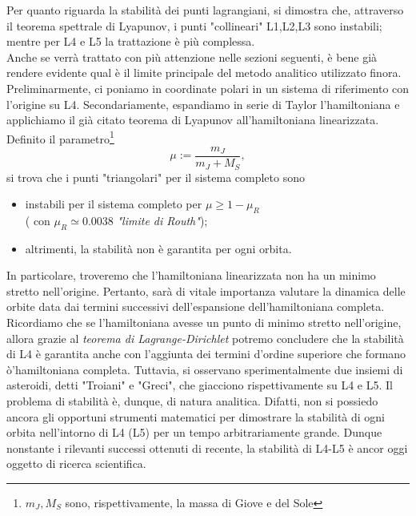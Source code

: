 \documentclass[a4paper,11pt,titlepage]{report}
\theoremstyle{definition}
\theoremstyle{plain}
\begin{document}
Per quanto riguarda la stabilità dei punti lagrangiani, si dimostra che, attraverso il teorema spettrale di Lyapunov, i punti "collineari" L1,L2,L3 sono instabili; mentre per L4 e L5 la trattazione è più complessa.
\\Anche se verrà trattato con più attenzione nelle sezioni seguenti, è bene già rendere evidente qual è il limite principale del metodo analitico utilizzato finora. 
\\Preliminarmente, ci poniamo in coordinate polari in un sistema di riferimento con l'origine su L4. Secondariamente, espandiamo in serie di Taylor l'hamiltoniana e applichiamo il già citato teorema di Lyapunov all'hamiltoniana linearizzata.
Definito il parametro\footnote{$m_J, M_S$ sono, rispettivamente, la massa di Giove e del Sole} $$\mu:= \frac{m_J}{m_J+M_S},$$ si trova che i punti "triangolari" per il sistema completo sono
\begin{itemize}
	\item instabili per il sistema completo per $ \mu \geq 1-\mu_R$ \\( con $\mu_R\simeq0.0038$ \textit{"limite di Routh"});
	\item altrimenti, la stabilità non è garantita per ogni orbita.
\end{itemize}
In particolare, troveremo che l'hamiltoniana linearizzata non ha un minimo stretto nell'origine. Pertanto, sarà di vitale importanza valutare la dinamica delle orbite data dai termini successivi dell'espansione dell'hamiltoniana completa. Ricordiamo che se l'hamiltoniana avesse un punto di minimo stretto nell'origine, allora grazie al \textit{teorema di Lagrange-Dirichlet} potremo concludere che la stabilità di L4 è garantita anche con l'aggiunta dei termini d'ordine superiore che formano ò'hamiltoniana completa.
Tuttavia, si osservano sperimentalmente due insiemi di asteroidi, detti "Troiani" e "Greci", che giacciono rispettivamente su L4 e L5. Il problema di stabilità è, dunque, di natura analitica. Difatti, non si possiedo ancora gli opportuni strumenti matematici per dimostrare la stabilità di ogni orbita nell'intorno di L4 (L5) per un tempo arbitrariamente grande. Dunque nonstante i rilevanti successi ottenuti di recente, la stabilità di L4-L5 è ancor oggi oggetto di ricerca scientifica.
\end{document}
